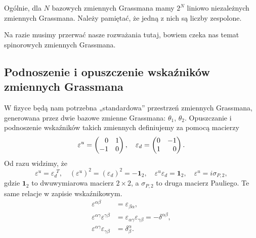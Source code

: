 \documentclass[a4paper,11pt]{article}
\begin{document}
Ogólnie, dla $N$ bazowych zmiennych Grassmana mamy $2^{ N }$ liniowo niezależnych zmiennych Grassmana. Należy pamiętać, że jedną z nich są liczby zespolone.

Na razie musimy przerwać nasze rozważania tutaj, bowiem czeka nas temat spinorowych zmiennych Grassmana.






\subsection{Podnoszenie i opuszczenie wskaźników zmiennych Grassmana}


W fizyce będą nam potrzebna „standardowa” przestrzeń zmiennych Grassmana, generowana przez dwie bazowe zmienne Grassmana: $\theta_{ 1 }$, $\theta_{ 2 }$. Opuszczanie i podnoszenie wskaźników takich zmiennych definiujemy za pomocą macierzy
\begin{equation}
  \label{eq:Zmienne-Grassmana-12}
  \varepsilon^{ u } =
  \begin{pmatrix}
    \hphantom{-}0 & 1 \\
    -1 & 0
  \end{pmatrix}, \quad
  \varepsilon_{ d } =
  \begin{pmatrix}
    0 & -1 \\
    1 & \hphantom{-}0
  \end{pmatrix}.
\end{equation}
Od razu widzimy, że
\begin{equation}
  \label{eq:Zmienne-Grassmana-13}
  \varepsilon^{ u } = \varepsilon_{ d }^{ \,\: T }, \quad
  ( \varepsilon^{ u } )^{ 2 } = ( \varepsilon_{ d } )^{ 2 }
  = -\mathbf{1}_{ 2 }, \quad
  \varepsilon^{ u } \varepsilon_{ d } = \mathbf{1}_{ 2 }, \quad
  \varepsilon^{ u } = i \sigma_{ P, 2 },
\end{equation}
gdzie $\mathbf{1}_{ 2 }$ to dwuwymiarowa macierz $2 \times 2$, a $\sigma_{ P, 2 }$ to druga macierz Pauliego. Te same relacje w zapisie wskaźnikowym.
\begin{subequations}
  \begin{align}
    \label{eq:Zmienne-Grassmana-14-A}
    \varepsilon^{ \alpha \beta } &= \varepsilon_{ \beta \alpha }, \\
    \varepsilon^{ \alpha \gamma } \varepsilon^{ \gamma \beta } &= \varepsilon_{ \alpha \gamma } \varepsilon_{ \gamma \beta } = -\delta^{ \alpha \beta }, \\
    \varepsilon^{ \alpha \gamma } \varepsilon_{ \gamma \beta } &= \delta^{ \alpha }_{ \beta }.
  \end{align}
\end{subequations}
\end{document}
